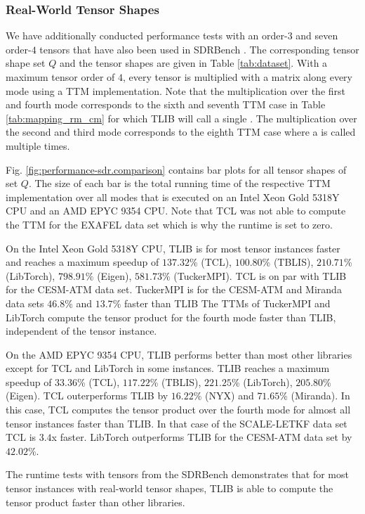 \subsubsection{Real-World Tensor Shapes}
We have additionally conducted performance tests with an order-$3$ and seven order-$4$ tensors that have also been used in SDRBench \cite{zhao:2020:sdrbench}.
The corresponding tensor shape set $Q$ and the tensor shapes are given in Table \ref{tab:dataset}.
With a maximum tensor order of $4$, every tensor is multiplied with a matrix along every mode using a TTM implementation.
Note that the multiplication over the first and fourth mode corresponds to the sixth and seventh TTM case in Table \ref{tab:mapping_rm_cm} for which TLIB will call a single .
The multiplication over the second and third mode corresponds to the eighth TTM case where a  is called multiple times.

Fig. \ref{fig:performance-sdr.comparison} contains bar plots for all tensor shapes of set $Q$.
The size of each bar is the total running time of the respective TTM implementation over all modes that is executed on an Intel Xeon Gold 5318Y CPU and an AMD EPYC 9354 CPU.
Note that TCL was not able to compute the TTM for the EXAFEL data set which is why the runtime is set to zero.

On the Intel Xeon Gold 5318Y CPU, TLIB is for most tensor instances faster and reaches a maximum speedup of $137.32$\% (TCL), $100.80$\% (TBLIS), $210.71$\% (LibTorch), $798.91$\% (Eigen), $581.73$\% (TuckerMPI).
TCL is on par with TLIB for the CESM-ATM data set.
TuckerMPI is for the CESM-ATM and Miranda data sets $46.8$\% and $13.7$\% faster than TLIB 
The TTMs of TuckerMPI and LibTorch compute the tensor product for the fourth mode faster than TLIB, independent of the tensor instance.

On the AMD EPYC 9354 CPU, TLIB performs better than most other libraries except for TCL and LibTorch in some instances.
TLIB reaches a maximum speedup of $33.36$\% (TCL), $117.22$\% (TBLIS), $221.25$\% (LibTorch), $205.80$\% (Eigen).
TCL outerperforms TLIB by $16.22$\% (NYX) and $71.65$\% (Miranda).
In this case, TCL computes the tensor product over the fourth mode for almost all tensor instances faster than TLIB.
In that case of the SCALE-LETKF data set TCL is $3.4$x faster.
LibTorch outperforms TLIB for the CESM-ATM data set by $42.02$\%.

The runtime tests with tensors from the SDRBench demonstrates that for most tensor instances with real-world tensor shapes, TLIB is able to compute the tensor product faster than other libraries.

